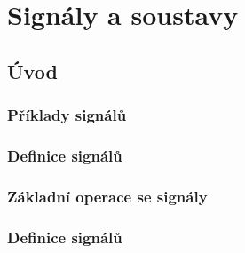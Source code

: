 \setchaptertoc
\chapter{Signály a soustavy}\label{tky:IchII}
  \section{Úvod}\label{tky:IchIIsecI}
    \subsection{Příklady signálů}\label{tky:IchIIsecIssecI}
    \subsection{Definice signálů}\label{tky:IchIIsecIssecII}
    \subsection{Základní operace se signály}\label{tky:IchIIsecIssecIII}
    \subsection{Definice signálů}\label{tky:IchIIsecIssecIV}

